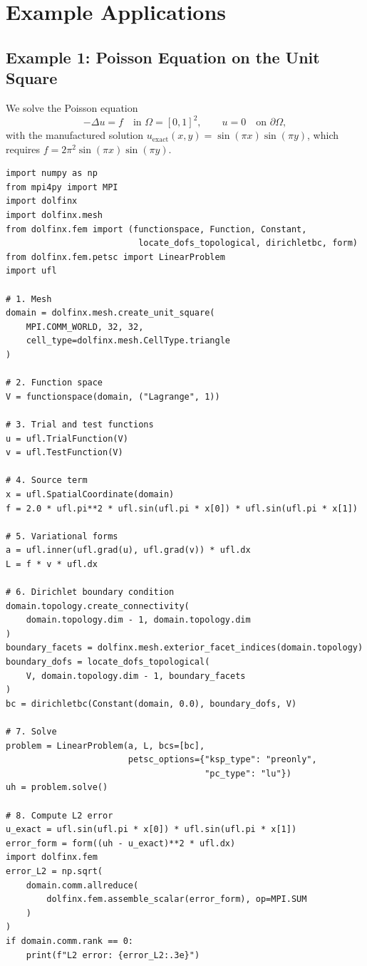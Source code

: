 \documentclass[11pt]{article}
\newcommand{\Lapl}{\Delta}
\newcommand{\domain}{\Omega}
\newcommand{\boundary}{\partial\Omega}
\begin{document}
\section{Example Applications}
\label{sec:examples}

\subsection{Example 1: Poisson Equation on the Unit Square}
\label{sec:ex-poisson}

We solve the Poisson equation
\begin{equation}
  -\Lapl u = f \quad \text{in } \domain = [0,1]^2,
  \qquad u = 0 \quad \text{on } \boundary,
\end{equation}
with the manufactured solution $u_\text{exact}(x,y) = \sin(\pi x)\sin(\pi y)$,
which requires $f = 2\pi^2 \sin(\pi x)\sin(\pi y)$.

\begin{lstlisting}[style=python, caption={Complete FEniCSx script for the Poisson equation.}]
import numpy as np
from mpi4py import MPI
import dolfinx
import dolfinx.mesh
from dolfinx.fem import (functionspace, Function, Constant,
                          locate_dofs_topological, dirichletbc, form)
from dolfinx.fem.petsc import LinearProblem
import ufl

# 1. Mesh
domain = dolfinx.mesh.create_unit_square(
    MPI.COMM_WORLD, 32, 32,
    cell_type=dolfinx.mesh.CellType.triangle
)

# 2. Function space
V = functionspace(domain, ("Lagrange", 1))

# 3. Trial and test functions
u = ufl.TrialFunction(V)
v = ufl.TestFunction(V)

# 4. Source term
x = ufl.SpatialCoordinate(domain)
f = 2.0 * ufl.pi**2 * ufl.sin(ufl.pi * x[0]) * ufl.sin(ufl.pi * x[1])

# 5. Variational forms
a = ufl.inner(ufl.grad(u), ufl.grad(v)) * ufl.dx
L = f * v * ufl.dx

# 6. Dirichlet boundary condition
domain.topology.create_connectivity(
    domain.topology.dim - 1, domain.topology.dim
)
boundary_facets = dolfinx.mesh.exterior_facet_indices(domain.topology)
boundary_dofs = locate_dofs_topological(
    V, domain.topology.dim - 1, boundary_facets
)
bc = dirichletbc(Constant(domain, 0.0), boundary_dofs, V)

# 7. Solve
problem = LinearProblem(a, L, bcs=[bc],
                        petsc_options={"ksp_type": "preonly",
                                       "pc_type": "lu"})
uh = problem.solve()

# 8. Compute L2 error
u_exact = ufl.sin(ufl.pi * x[0]) * ufl.sin(ufl.pi * x[1])
error_form = form((uh - u_exact)**2 * ufl.dx)
import dolfinx.fem
error_L2 = np.sqrt(
    domain.comm.allreduce(
        dolfinx.fem.assemble_scalar(error_form), op=MPI.SUM
    )
)
if domain.comm.rank == 0:
    print(f"L2 error: {error_L2:.3e}")
\end{lstlisting}
\end{document}
